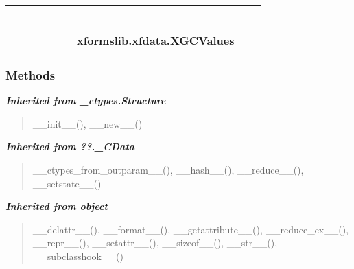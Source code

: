     \label{xformslib:xfdata:XGCValues}
\begin{tabular}{cccccccccc}
\multicolumn{2}{r}{\settowidth{\BCL}{object}\multirow{2}{\BCL}{object}}
&&
&&
&&
  \\\cline{3-3}
  &&\multicolumn{1}{c|}{}
&&
&&
&&
  \\
\multicolumn{4}{r}{\settowidth{\BCL}{??.\_CData}\multirow{2}{\BCL}{??.\_CData}}
&&
&&
  \\\cline{5-5}
  &&&&\multicolumn{1}{c|}{}
&&
&&
  \\
\multicolumn{6}{r}{\settowidth{\BCL}{\_ctypes.Structure}\multirow{2}{\BCL}{\_ctypes.Structure}}
&&
  \\\cline{7-7}
  &&&&&&\multicolumn{1}{c|}{}
&&
  \\
&&&&&&\multicolumn{2}{l}{\textbf{xformslib.xfdata.XGCValues}}
\end{tabular}



  \subsubsection{Methods}


\large{\textbf{\textit{Inherited from \_ctypes.Structure}}}

\begin{quote}
\_\_init\_\_(), \_\_new\_\_()
\end{quote}

\large{\textbf{\textit{Inherited from ??.\_CData}}}

\begin{quote}
\_\_ctypes\_from\_outparam\_\_(), \_\_hash\_\_(), \_\_reduce\_\_(), \_\_setstate\_\_()
\end{quote}

\large{\textbf{\textit{Inherited from object}}}

\begin{quote}
\_\_delattr\_\_(), \_\_format\_\_(), \_\_getattribute\_\_(), \_\_reduce\_ex\_\_(), \_\_repr\_\_(), \_\_setattr\_\_(), \_\_sizeof\_\_(), \_\_str\_\_(), \_\_subclasshook\_\_()
\end{quote}


